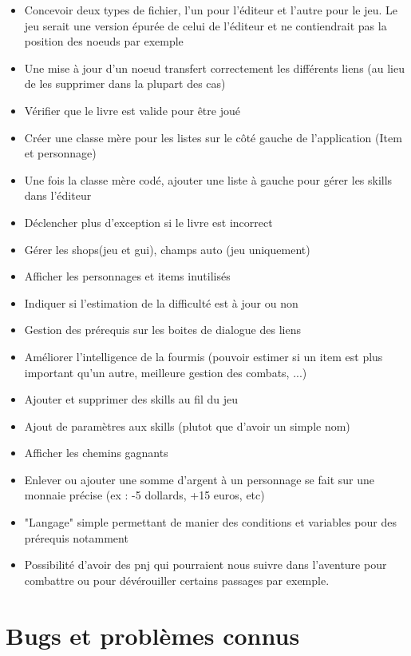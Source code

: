 		\begin{itemize}
			\item{Concevoir deux types de fichier, l'un pour l'éditeur et l'autre pour le jeu. Le jeu serait une version épurée de celui de l'éditeur et ne contiendrait pas la position des noeuds par exemple}
			\item{Une mise à jour d'un noeud transfert correctement les différents liens (au lieu de les supprimer dans la plupart des cas)}
			\item{Vérifier que le livre est valide pour être joué}
			\item{Créer une classe mère pour les listes sur le côté gauche de l'application (Item et personnage)}
			\item{Une fois la classe mère codé, ajouter une liste à gauche pour gérer les skills dans l'éditeur}
			\item{Déclencher plus d'exception si le livre est incorrect}
			\item{Gérer les shops(jeu et gui), champs auto (jeu uniquement)}
			\item{Afficher les personnages et items inutilisés}
			\item{Indiquer si l'estimation de la difficulté est à jour ou non}
			\item{Gestion des prérequis sur les boites de dialogue des liens}
			\item{Améliorer l'intelligence de la fourmis (pouvoir estimer si un item est plus important qu'un autre, meilleure gestion des combats, ...)}
			\item{Ajouter et supprimer des skills au fil du jeu}
			\item{Ajout de paramètres aux skills (plutot que d'avoir un simple nom)}
			\item{Afficher les chemins gagnants}
			\item{Enlever ou ajouter une somme d'argent à un personnage se fait sur une monnaie précise (ex : -5 dollards, +15 euros, etc)}
			\item{"Langage" simple permettant de manier des conditions et variables pour des prérequis notamment}
			\item{Possibilité d'avoir des pnj qui pourraient nous suivre dans l'aventure pour combattre ou pour dévérouiller certains passages par exemple.}
		\end{itemize}

	\section{Bugs et problèmes connus}

